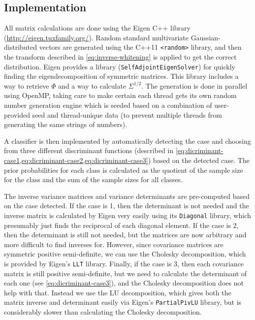 \documentclass[headings=optiontoheadandtoc,listof=totoc,parskip=full]{scrartcl}
\begin{document}
\subsection{Implementation}
\label{sec:part-1-impl}

All matrix calculations are done using the Eigen C++ library (\url{http://eigen.tuxfamily.org/}). Random standard multivariate Gaussian-distributed vectors are generated using the C++11 \texttt{<random>} library, and then the transform described in \cref{eq:inverse-whitening} is applied to get the correct distribution. Eigen provides a library (\texttt{SelfAdjointEigenSolver}) for quickly finding the eigendecomposition of symmetric matrices. This library includes a way to retrieve $\Phi$ and a way to calculate $\Sigma^{1/2}$. The generation is done in parallel using OpenMP, taking care to make certain each thread gets its own random number generation engine which is seeded based on a combination of user-provided seed and thread-unique data (to prevent multiple threads from generating the same strings of numbers).

A classifier is then implemented by automatically detecting the case and choosing from three different discriminant functions (described in \cref{eq:dicriminant-case1,eq:dicriminant-case2,eq:dicriminant-case3}) based on the detected case. The prior probabilities for each class is calculated as the quotient of the sample size for the class and the sum of the sample sizes for all classes.

The inverse variance matrices and variance determinants are pre-computed based on the case detected. If the case is 1, then the determinant is not needed and the inverse matrix is calculated by Eigen very easily using its \texttt{Diagonal} library, which presumably just finds the reciprocal of each diagonal element. If the case is 2, then the determinant is still not needed, but the matrices are now arbitrary and more difficult to find inverses for. However, since covariance matrices are symmetric positive semi-definite, we can use the Cholesky decomposition, which is provided by Eigen's \texttt{LLT} library. Finally, if the case is 3, then each covariance matrix is still positive semi-definite, but we need to calculate the determinant of each one (see \cref{eq:dicriminant-case3}), and the Cholesky decomposition does not help with that. Instead we use the LU decomposition, which gives both the matrix inverse and determinant easily via Eigen's \texttt{PartialPivLU} library, but is considerably slower than calculating the Cholesky decomposition.
\end{document}
